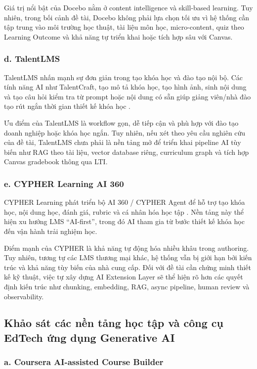 Giá trị nổi bật của Docebo nằm ở content intelligence và skill-based learning.
Tuy nhiên, trong bối cảnh đề tài, Docebo không phải lựa chọn tối ưu vì hệ thống
cần tập trung vào môi trường học thuật, tài liệu môn học, micro-content, quiz
theo Learning Outcome và khả năng tự triển khai hoặc tích hợp sâu với Canvas.

\subsubsection*{d. TalentLMS}

TalentLMS nhấn mạnh sự đơn giản trong tạo khóa học và đào tạo nội bộ. Các tính
năng AI như TalentCraft, tạo mô tả khóa học, tạo hình ảnh, sinh nội dung và tạo
câu hỏi kiểm tra từ prompt hoặc nội dung có sẵn giúp giảng viên/nhà đào tạo rút
ngắn thời gian thiết kế khóa học \cite{talentlms-ai}.

Ưu điểm của TalentLMS là workflow gọn, dễ tiếp cận và phù hợp với đào tạo doanh
nghiệp hoặc khóa học ngắn. Tuy nhiên, nếu xét theo yêu cầu nghiên cứu của đề
tài, TalentLMS chưa phải là nền tảng mở để triển khai pipeline AI tùy biến như
RAG theo tài liệu, vector database riêng, curriculum graph và tích hợp Canvas
gradebook thông qua LTI.

\subsubsection*{e. CYPHER Learning AI 360}

CYPHER Learning phát triển bộ AI 360 / CYPHER Agent để hỗ trợ tạo khóa học, nội
dung học, đánh giá, rubric và cá nhân hóa học tập \cite{cypher-ai}.
Nền tảng này thể hiện xu hướng LMS ``AI-first'', trong đó AI tham gia từ bước
thiết kế khóa học đến vận hành trải nghiệm học.

Điểm mạnh của CYPHER là khả năng tự động hóa nhiều khâu trong authoring. Tuy
nhiên, tương tự các LMS thương mại khác, hệ thống vẫn bị giới hạn bởi kiến trúc
và khả năng tùy biến của nhà cung cấp. Đối với đề tài cần chứng minh thiết kế
kỹ thuật, việc tự xây dựng AI Extension Layer sẽ thể hiện rõ hơn các quyết định
kiến trúc như chunking, embedding, RAG, async pipeline, human review và
observability.

\subsection{Khảo sát các nền tảng học tập và công cụ EdTech ứng dụng Generative AI}

\subsubsection*{a. Coursera AI-assisted Course Builder}

